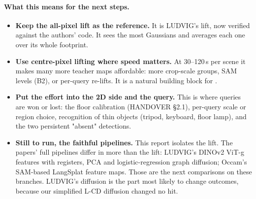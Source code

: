 \paragraph{What this means for the next steps.}
\begin{itemize}[leftmargin=*,itemsep=2pt]
  \item \textbf{Keep the all-pixel lift as the reference.} It is LUDVIG's lift, now verified against the authors' code.
        It sees the most Gaussians and averages each one over its whole footprint.
  \item \textbf{Use centre-pixel lifting where speed matters.} At 30--120\,s per scene it makes many more teacher
        maps affordable: more crop-scale groups, SAM levels (B2), or per-query re-lifts. It is a natural building block
        for .
  \item \textbf{Put the effort into the 2D side and the query.} This is where queries are won or lost: the floor
        calibration (HANDOVER \S2.1), per-query scale or region choice, recognition of thin objects (tripod, keyboard,
        floor lamp), and the two persistent "absent" detections.
  \item \textbf{Still to run, the faithful pipelines.} This report isolates the lift. The papers' full pipelines
        differ in more than the lift: LUDVIG's DINOv2 ViT-g features with registers, PCA and logistic-regression graph
        diffusion; Occam's SAM-based LangSplat feature maps. Those are the next comparisons on these branches. LUDVIG's
        diffusion is the part most likely to change outcomes, because our simplified L-CD diffusion changed no hit.
\end{itemize}
